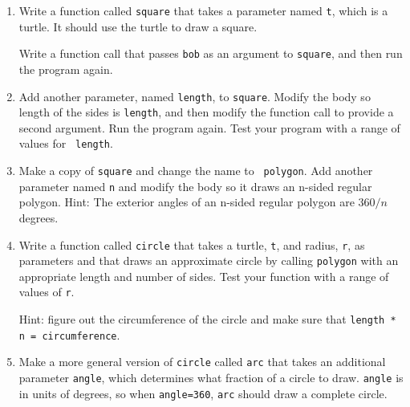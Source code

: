\begin{enumerate}

\item Write a function called {\tt square} that takes a parameter
named {\tt t}, which is a turtle.  It should use the turtle to draw
a square.

Write a function call that passes {\tt bob} as an argument to
{\tt square}, and then run the program again.

\item Add another parameter, named {\tt length}, to {\tt square}.
Modify the body so length of the sides is {\tt length}, and then
modify the function call to provide a second argument.  Run the
program again.  Test your program with a range of values for {\tt
length}.

\item Make a copy of {\tt square} and change the name to {\tt
  polygon}.  Add another parameter named {\tt n} and modify the body
  so it draws an n-sided regular polygon.  Hint: The exterior angles
  of an n-sided regular polygon are $360/n$ degrees.   

\item Write a function called {\tt circle} that takes a turtle,
{\tt t}, and radius, {\tt r}, as parameters and that draws an
approximate circle by calling {\tt polygon} with an appropriate
length and number of sides.  Test your function with a range of values
of {\tt r}.   

Hint: figure out the circumference of the circle and make sure that
{\tt length * n = circumference}.

\item Make a more general version of {\tt circle} called {\tt arc}
that takes an additional parameter {\tt angle}, which determines
what fraction of a circle to draw.  {\tt angle} is in units of
degrees, so when {\tt angle=360}, {\tt arc} should draw a complete
circle.

\end{enumerate}

